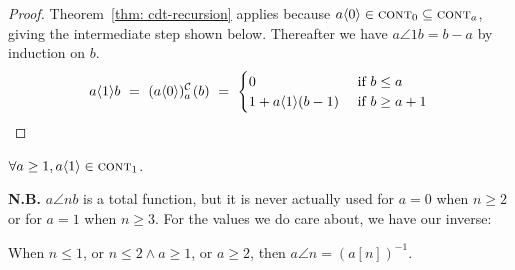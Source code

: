 \begin{proof}
Theorem~\ref{thm: cdt-recursion} applies because $a\langle 0\rangle \in \text{\scshape{cont}}_0 \subseteq \text{\scshape{cont}}_{a}$, giving the intermediate step shown below.
Thereafter we have $a\angle{1}b = b - a$ by induction on $b$.
\begin{equation*}
a\angle{1}b \ = \ \cdt{\left(a\angle{0}\right)}{a}(b) \ = \ \begin{cases}
0 & \text{ if } b\le a \\ 1 + a\angle{1}(b - 1) & \text{ if } b\ge a+1 \end{cases} \\
\end{equation*}
\end{proof}
\begin{col} \label{col: inv-hyperop-1-contr1}
$\forall a \ge 1, a\langle 1\rangle \in \text{\scshape{cont}}_1$.
\end{col}
\noindent \textbf{N.B.} $a\angle{n}b$ is a total function, but it is never actually used for $a = 0$ when $n \ge 2$ or for $a=1$ when $n \ge 3$. For the values
we do care about, we have our inverse:
\begin{thm} \label{thm: inv-hyperop-correct}
	\href{https://github.com/inv-ack/inv-ack/blob/7270e64a2600b771f2b1b1b151f7d13fb2ae6c97/applications.v#L72-L98}{\color{blue}\coq}
When $n\le 1$, or $n \le 2 \wedge a\ge 1$, or $a\ge 2$, then
$a\angle{n} = \left(a[n]\right)^{-1}$.
\end{thm}
